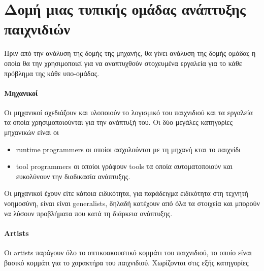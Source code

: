 \section{Δομή μιας τυπικής ομάδας ανάπτυξης παιχνιδιών}
	Πριν από την ανάλυση της δομής της μηχανής, θα γίνει ανάλυση της δομής ομάδας η οποία θα την χρησιμοποιεί για να αναπτυχθούν στοχευμένα εργαλεία για το κάθε πρόβλημα της κάθε υπο-ομάδας.
	
	\paragraph{Μηχανικοί}	
	Οι μηχανικοί σχεδιάζουν και υλοποιούν το λογισμικό του παιχνιδιού και τα εργαλεία τα οποία χρησιμοποιούνται για την ανάπτυξή του. Οι δύο μεγάλες κατηγορίες μηχανικών είναι οι
	\begin{itemize}
		\item runtime programmers οι οποίοι ασχολούνται με τη μηχανή κται το παιχνίδι 
		\item tool programmers οι οποίοι γράφουν tools τα οποία αυτοματοποιούν και ευκολύνουν την διαδικασία ανάπτυξης.
	\end{itemize}
	Οι μηχανικοί έχουν είτε κάποια ειδικότητα, για παράδειγμα ειδικότητα στη τεχνητή νοημοσύνη, είναι είναι generalists, δηλαδή κατέχουν από όλα τα στοιχεία και μπορούν να λύσουν προβλήματα που κατά τη διάρκεια ανάπτυξης.
	
	\paragraph{Artists}
	Οι artists παράγουν όλο το οπτικοακουστικό κομμάτι του παιχνιδιού, το οποίο είναι βασικό κομμάτι για το χαρακτήρα του παιχνιδιού. Χωρίζονται στις εξής κατηγορίες
	
